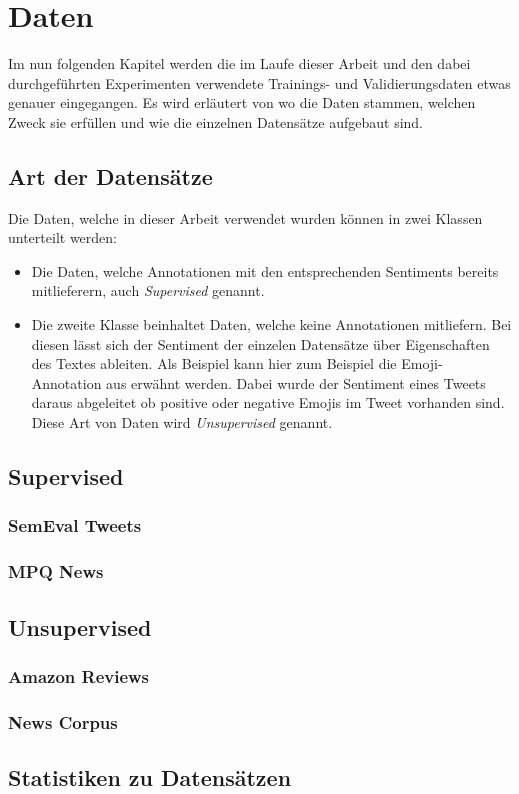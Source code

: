 \chapter{Daten}
Im nun folgenden Kapitel werden die im Laufe dieser Arbeit und den dabei durchgeführten Experimenten verwendete Trainings- und Validierungsdaten etwas genauer eingegangen. Es wird erläutert von wo die Daten stammen, welchen Zweck sie erfüllen und wie die einzelnen Datensätze aufgebaut sind.

\section{Art der Datensätze}
Die Daten, welche in dieser Arbeit verwendet wurden können in zwei Klassen unterteilt werden:

\begin{itemize}
	\item Die Daten, welche Annotationen mit den entsprechenden Sentiments bereits mitlieferern, auch \emph{Supervised} genannt.
	\item Die zweite Klasse beinhaltet Daten, welche keine Annotationen mitliefern. Bei diesen lässt sich der Sentiment der einzelen Datensätze über Eigenschaften des Textes ableiten. Als Beispiel kann hier zum Beispiel die Emoji-Annotation aus \cite{DeriuMasterThesis} erwähnt werden. Dabei wurde der Sentiment eines Tweets daraus abgeleitet ob positive oder negative Emojis im Tweet vorhanden sind. Diese Art von Daten wird \emph{Unsupervised} genannt.
\end{itemize}

\section{Supervised}

\subsection{SemEval Tweets}
\blindtext
\subsection{MPQ News}
\blindtext
\section{Unsupervised}
\subsection{Amazon Reviews}
\blindtext
\subsection{News Corpus}
\blindtext
\section{Statistiken zu Datensätzen}
\blindtext